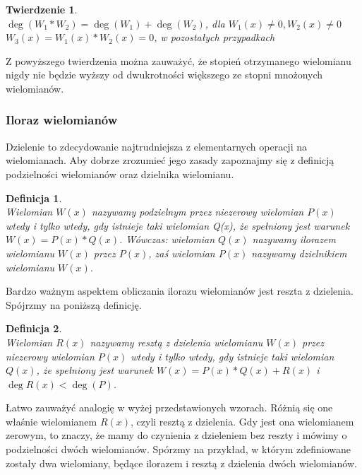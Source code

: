 \documentclass[oneside,a4paper]{book}
\newtheorem{theorem}{Twierdzenie}
\newtheorem{definition}{Definicja}
\begin{document}
	\begin{theorem}
		$ $\\
		$\deg(W_1 * W_2) = \deg(W_1) + \deg(W_2)$, dla $W_1(x) \neq 0, W_2(x) \neq 0$\\
		$W_3(x) = W_1(x) * W_2(x) = 0$, w pozostałych przypadkach
	\end{theorem}
	
	Z powyższego twierdzenia można zauważyć, że stopień otrzymanego wielomianu nigdy nie będzie wyższy od dwukrotności większego ze stopni mnożonych wielomianów.
	
	\subsubsection{Iloraz wielomianów}
	
	Dzielenie to zdecydowanie najtrudniejsza z elementarnych operacji na wielomianach. Aby dobrze zrozumieć jego zasady zapoznajmy się z definicją podzielności wielomianów oraz dzielnika wielomianu.
	
	\begin{definition}
		$ $\\
		Wielomian $W(x)$ nazywamy podzielnym przez niezerowy wielomian $P(x)$ wtedy i tylko wtedy, gdy istnieje taki wielomian Q(x), że spełniony jest warunek $W(x) = P(x) * Q(x)$. Wówczas: wielomian $Q(x)$ nazywamy ilorazem wielomianu $W(x)$ przez $P(x)$, zaś wielomian $P(x)$ nazywamy dzielnikiem wielomianu $W(x)$.
	\end{definition}
	
	Bardzo ważnym aspektem obliczania ilorazu wielomianów jest reszta z dzielenia. Spójrzmy na poniższą definicję.
	
	\begin{definition}
		$ $\\
		Wielomian $R(x)$ nazywamy resztą z dzielenia wielomianu $W(x)$ przez niezerowy wielomian $P(x)$ wtedy i tylko wtedy, gdy istnieje taki wielomian $Q(x)$, że spełniony jest warunek $W(x) = P(x) * Q(x) + R(x)$ i $\deg R(x) < \deg(P)$.
	\end{definition}
	
	Łatwo zauważyć analogię w wyżej przedstawionych wzorach. Różnią się one właśnie wielomianem $R(x)$, czyli resztą z dzielenia. Gdy jest ona wielomianem zerowym, to znaczy, że mamy do czynienia z dzieleniem bez reszty i mówimy o podzielności dwóch wielomianów. Spórzmy na przykład, w którym zdefiniowane zostały dwa wielomiany, będące ilorazem i resztą z dzielenia dwóch wielomianów.
	
\end{document}
